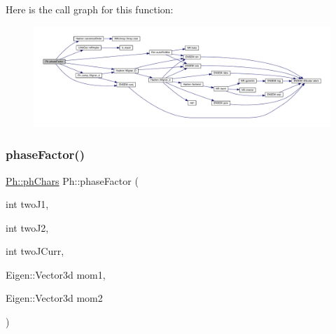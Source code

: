 Here is the call graph for this function\+:\nopagebreak
\begin{figure}[H]
\begin{center}
\leavevmode
\includegraphics[width=350pt]{d6/d3c/namespacePh_a51140cf285f02c028134a1e40807b54b_cgraph}
\end{center}
\end{figure}
\mbox{\label{namespacePh_a438e6a04475dc71cc60cc5ad034e09b0}} 
\subsubsection{\texorpdfstring{phaseFactor()}{phaseFactor()}\hspace{0.1cm}{\footnotesize\ttfamily [2/2]}}
{\footnotesize\ttfamily \mbox{\hyperlink{structPh_1_1phChars}{Ph\+::ph\+Chars}} Ph\+::phase\+Factor (\begin{DoxyParamCaption}\item[{int}]{two\+J1,  }\item[{int}]{two\+J2,  }\item[{int}]{two\+J\+Curr,  }\item[{Eigen\+::\+Vector3d}]{mom1,  }\item[{Eigen\+::\+Vector3d}]{mom2 }\end{DoxyParamCaption})}


